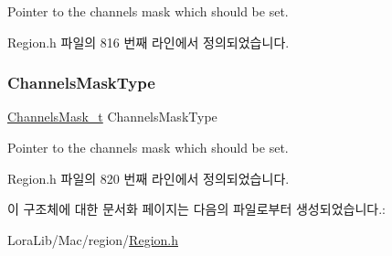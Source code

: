 Pointer to the channels mask which should be set. 

Region.\+h 파일의 816 번째 라인에서 정의되었습니다.

\mbox{\label{structs_chan_mask_set_params_a02b75be74cbc34fa2126b2c250ea9283}} 
\subsubsection{\texorpdfstring{Channels\+Mask\+Type}{ChannelsMaskType}}
{\footnotesize\ttfamily \mbox{\hyperlink{group___r_e_g_i_o_n_ga933f695eea70935418e2175940b92311}{Channels\+Mask\+\_\+t}} Channels\+Mask\+Type}

Pointer to the channels mask which should be set. 

Region.\+h 파일의 820 번째 라인에서 정의되었습니다.



이 구조체에 대한 문서화 페이지는 다음의 파일로부터 생성되었습니다.\+:\begin{DoxyCompactItemize}
\item 
Lora\+Lib/\+Mac/region/\mbox{\hyperlink{_region_8h}{Region.\+h}}\end{DoxyCompactItemize}
